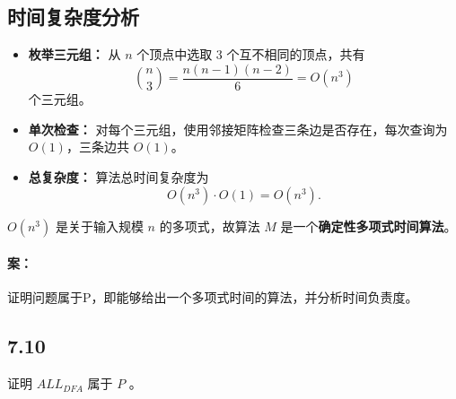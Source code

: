 \begin{answerred}
\subsection*{时间复杂度分析}
 
\begin{itemize}
  \item \textbf{枚举三元组：} 从 $n$ 个顶点中选取 $3$ 个互不相同的顶点，共有
  \[
    \binom{n}{3} = \frac{n(n-1)(n-2)}{6} = O(n^3)
  \]
  个三元组。
 
  \item \textbf{单次检查：} 对每个三元组，使用邻接矩阵检查三条边是否存在，每次查询为 $O(1)$，三条边共 $O(1)$。
 
  \item \textbf{总复杂度：} 算法总时间复杂度为
  \[
    O(n^3) \cdot O(1) = O(n^3).
  \]
\end{itemize}
 
$O(n^3)$ 是关于输入规模 $n$ 的多项式，故算法 $M$ 是一个\textbf{确定性多项式时间算法}。

\begin{answernote}
\paragraph{案：} 证明问题属于P，即能够给出一个多项式时间的算法，并分析时间负责度。

\end{answernote}
\end{answerred}
\subsection*{7.10}

证明 $ALL_{DFA}$ 属于 $P$ 。

